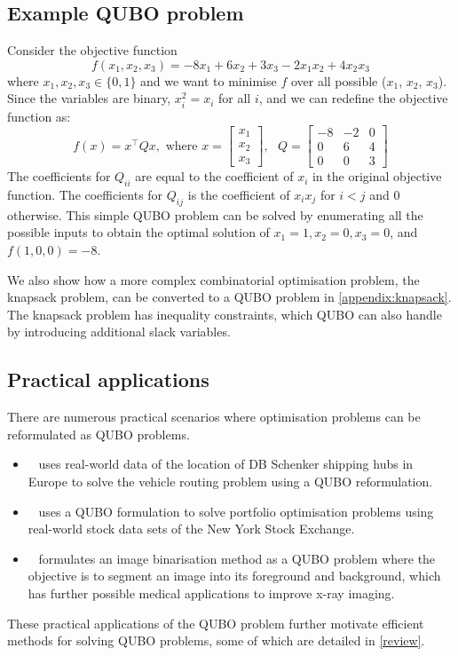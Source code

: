 \subsection{Example QUBO problem}\label{subsection:example_qubo}
Consider the objective function \begin{equation}
f(x_1, x_2, x_3) = -8x_1 + 6x_2 + 3x_3 - 2 x_1 x_2 + 4 x_2 x_3
\end{equation} where $x_1, x_2, x_3 \in \{0, 1\}$ and we want to minimise $f$ over all possible ($x_1$, $x_2$, $x_3$). Since the variables are binary, $x_i^2 = x_i$ for all $i$, and we can redefine the objective function as:
\begin{equation}
f(x) = x^\intercal Q x, \text{ where } x = \begin{bmatrix}
x_1 \\
x_2 \\
x_3 
\end{bmatrix}, \text{ }
Q = \begin{bmatrix}
-8 & -2 & 0\\
0 & 6 & 4\\
0 & 0 & 3
\end{bmatrix}
\end{equation}
The coefficients for $Q_{ii}$ are equal to the coefficient of $x_i$ in the original objective function. The coefficients for $Q_{ij}$ is the coefficient of $x_{i}x_j$ for $i < j$ and $0$ otherwise. This simple QUBO problem can be solved by enumerating all the possible inputs to obtain the optimal solution of $x_1 = 1, x_2 = 0, x_3 = 0$, and $f(1,0,0) = -8$.

We also show how a more complex combinatorial optimisation problem, the knapsack problem, can be converted to a QUBO problem in \autoref{appendix:knapsack}. The knapsack problem has inequality constraints, which QUBO can also handle by introducing additional slack variables.

\subsection{Practical applications}
There are numerous practical scenarios where optimisation problems can be reformulated as QUBO problems. 
\begin{itemize}
    \item~\cite{b7} uses real-world data of the location of DB Schenker shipping hubs in Europe to solve the vehicle routing problem using a QUBO reformulation.
    \item~\cite{b8} uses a QUBO formulation to solve portfolio optimisation problems using real-world stock data sets of the New York Stock Exchange.
    \item~\cite{b9} formulates an image binarisation method as a QUBO problem where the objective is to segment an image into its foreground and background, which has further possible medical applications to improve x-ray imaging.
\end{itemize}
These practical applications of the QUBO problem further motivate efficient methods for solving QUBO problems, some of which are detailed in \autoref{review}.


